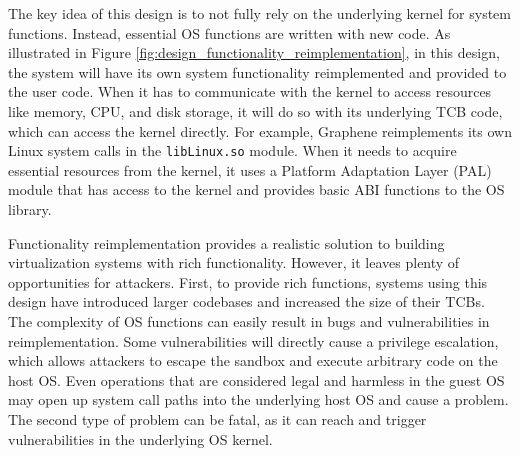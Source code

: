 The key idea of this design is to not fully rely on the underlying
kernel for system functions. Instead, essential OS functions are written with new
code. As illustrated in Figure \ref{fig:design_functionality_reimplementation},
in this design, the system will have its own system functionality reimplemented and
provided to the user code. When it has to communicate with the kernel
to access resources like memory, CPU, and disk storage, it will do so with
its underlying TCB code, which can access the kernel directly.
For example, Graphene \cite{Graphene-14} reimplements
its own Linux system calls in the
\texttt{libLinux.so} module. When it needs to acquire essential resources from
the kernel, it uses a
Platform Adaptation Layer (PAL)  module that has access to the kernel
and provides basic ABI functions to the OS library.

Functionality reimplementation provides a
realistic solution to building virtualization systems
with rich functionality. However, it
leaves plenty of opportunities for attackers.
First, to provide rich functions, systems using this design have
introduced larger codebases and increased the size of their TCBs.
The complexity of OS functions can easily result in bugs and vulnerabilities in
reimplementation. Some vulnerabilities
will directly cause a privilege escalation, which allows attackers to escape the sandbox
and execute arbitrary code on the host OS.
Even operations that are considered
legal and harmless in the guest OS may open up system call paths into the underlying
host OS and cause a problem.
The second type of problem can be fatal, as it can reach and
trigger vulnerabilities in the underlying OS kernel.


